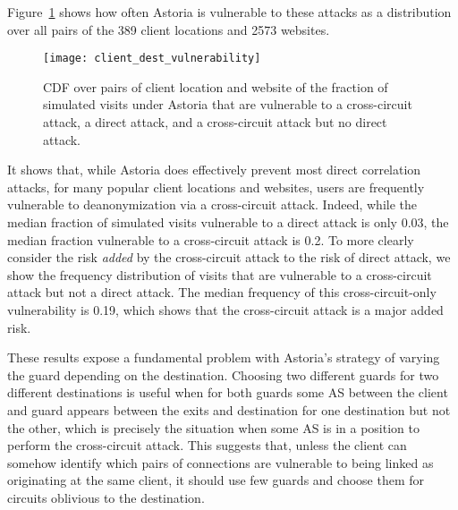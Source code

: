 \documentclass[conference]{styles/IEEEtran}
\begin{document}
Figure~\ref{fig:cross_attack_results} shows how often Astoria is vulnerable to these attacks as a
distribution over all pairs of the 389 client locations and 2573 websites.
\begin{figure}[ht]
\centering
\texttt{[image: client\_dest\_vulnerability]}
\vspace{-4mm}
\caption{\small CDF over pairs of client location and website of the fraction of simulated
visits under Astoria that are vulnerable to a cross-circuit attack, a direct attack, and a
cross-circuit attack but no direct attack.}
\label{fig:cross_attack_results}
\vspace{-4mm}
\end{figure}
It shows that, while Astoria does effectively prevent most direct correlation attacks, for many
popular client locations and websites, users are frequently vulnerable to deanonymization via a
cross-circuit attack. Indeed, while the median fraction of simulated visits vulnerable to a direct
attack is only 0.03, the median fraction vulnerable to a cross-circuit attack is 0.2. To more
clearly consider the risk \emph{added} by the cross-circuit attack to the risk of direct attack, we
show the frequency distribution of visits that are vulnerable to a cross-circuit attack but not a
direct attack. The median frequency of this cross-circuit-only vulnerability is 0.19, which shows
that the cross-circuit attack is a major added risk.

These results expose a fundamental problem
with Astoria's strategy of varying the guard depending on the destination. Choosing two
different guards for two different destinations is
useful when for both guards some AS between the client and guard appears between the exits and
destination for one destination but not the other, which is precisely the situation when some AS is
in a position to perform the cross-circuit attack. This suggests that, unless the client can
somehow identify which pairs of connections are vulnerable to being linked as originating at the
same client, it should use few guards and choose them for circuits oblivious to the destination.

\else
\end{document}
